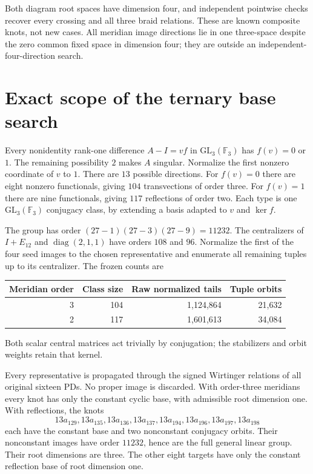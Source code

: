 \documentclass[11pt]{article}
\newcommand{\F}{\mathbb F}
\begin{document}
Both diagram root spaces have dimension four, and independent
pointwise checks recover every crossing and all three braid
relations. These are known composite knots, not new cases.
All meridian image directions lie in one three-space despite
the zero common fixed space in dimension four; they are
outside an independent-four-direction search.

\section{Exact scope of the ternary base search}

Every nonidentity rank-one difference $A-I=vf$ in
$\mathrm{GL}_3(\F_3)$ has $f(v)=0$ or $1$. The remaining
possibility $2$ makes $A$ singular. Normalize the first
nonzero coordinate of $v$ to $1$. There are $13$ possible
directions. For $f(v)=0$ there are eight nonzero functionals,
giving $104$ transvections of order three. For $f(v)=1$
there are nine functionals, giving $117$ reflections of
order two. Each type is one $\mathrm{GL}_3(\F_3)$ conjugacy
class, by extending a basis adapted to $v$ and $\ker f$.

The group has order $(27-1)(27-3)(27-9)=11232$. The
centralizers of $I+E_{12}$ and $\operatorname{diag}(2,1,1)$
have orders $108$ and $96$. Normalize the first of the four
seed images to the chosen representative and enumerate all
remaining tuples up to its centralizer. The frozen counts are
\begin{center}
\begin{tabular}{rrrr}
\toprule
Meridian order & Class size & Raw normalized tails & Tuple orbits\\
\midrule
3 & 104 & 1,124,864 & 21,632\\
2 & 117 & 1,601,613 & 34,084\\
\bottomrule
\end{tabular}
\end{center}
Both scalar central matrices act trivially by conjugation;
the stabilizers and orbit weights retain that kernel.

Every representative is propagated through the signed
Wirtinger relations of all original sixteen PDs. No proper
image is discarded. With order-three meridians every knot
has only the constant cyclic base, with admissible root
dimension one. With reflections, the knots
\[
 13a_{129},13a_{135},13a_{136},13a_{137},
 13a_{194},13a_{196},13a_{197},13a_{198}
\]
each have the constant base and two nonconstant conjugacy
orbits. Their nonconstant images have order $11232$, hence
are the full general linear group. Their root dimensions
are three. The other eight targets have only the constant
reflection base of root dimension one.
\end{document}
